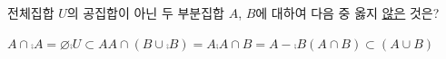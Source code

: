 전체집합 $U$의 공집합이 아닌 두 부분집합 $A$, $B$에 대하여 다음 중 옳지 \underline{않은} 것은?
\begin{choicesii}{$A\cap\comp{A}=\varnothing$}{$\comp{U}\subset A$}{$A\cap(B\cup\comp{B})=A$}{$\comp{A}\cap B=A-\comp{B}$}{$(A\cap B)\subset(A\cup B)$}\end{choicesii}
